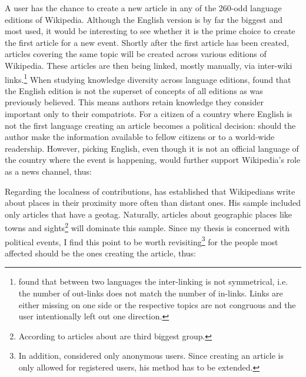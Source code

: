 A user has the chance to create a new article in any of the 260-odd language editions of Wikipedia.
Although the English version is by far the biggest and most used, it would be interesting to see whether it is the prime choice to create the first article for a new event.
Shortly after the first article has been created, articles covering the same topic will be created across various editions of Wikipedia.
These articles are then being linked, mostly manually, via inter-wiki links.\footnote{\textcite{adar2009information} found that between two languages the inter-linking is not symmetrical, i.e. the number of out-links does not match the number of in-links. Links are either missing on one side or the respective topics are not congruous and the user intentionally left out one direction.}
When studying knowledge diversity across language editions, \textcite{hecht2010tower} found that the English edition is not the superset of concepts of all editions as was previously believed.
This means authors retain knowledge they consider important only to their compatriots. 
For a citizen of a country where English is not the first language creating an article becomes a political decision: should the author make the information available to fellow citizens or to a world-wide readership.
However, picking English, even though it is not an official language of the country where the event is happening, would further support Wikipedia's role as a news channel, thus:


Regarding the localness of contributions, \textcite[57]{hardy2011volunteered} has established that Wikipedians write about places in their proximity more often than distant ones.
His sample included only articles that have a geotag.
Naturally, articles about geographic places like towns and sights\footnote{According to \textcite{kittur2009s} articles about  are third biggest group.} will dominate this sample.
Since my thesis is concerned with political events, I find this point to be worth revisiting\footnote{In addition, \textcite[61]{hardy2011volunteered} considered only anonymous users. Since creating an article is only allowed for registered users, his method has to be extended.} for the people most affected should be the ones creating the article, thus:



